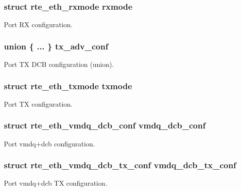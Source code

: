 \subsubsection[{rxmode}]{\setlength{\rightskip}{0pt plus 5cm}struct {\bf rte\+\_\+eth\+\_\+rxmode} rxmode}\label{structrte__eth__conf_a346eef99c24f617b74c440c1aa565d01}
Port R\+X configuration. \hypertarget{structrte__eth__conf_a55469f11d3c2e6c76488152651bcf464}{}
\subsubsection[{tx\+\_\+adv\+\_\+conf}]{\setlength{\rightskip}{0pt plus 5cm}union \{ ... \}   tx\+\_\+adv\+\_\+conf}\label{structrte__eth__conf_a55469f11d3c2e6c76488152651bcf464}
Port T\+X D\+C\+B configuration (union). \hypertarget{structrte__eth__conf_a1c33c9d2e5cdb14b62ed386bf3159e07}{}
\subsubsection[{txmode}]{\setlength{\rightskip}{0pt plus 5cm}struct {\bf rte\+\_\+eth\+\_\+txmode} txmode}\label{structrte__eth__conf_a1c33c9d2e5cdb14b62ed386bf3159e07}
Port T\+X configuration. \hypertarget{structrte__eth__conf_a3955257d0cf03d4f49c64e674f132359}{}
\subsubsection[{vmdq\+\_\+dcb\+\_\+conf}]{\setlength{\rightskip}{0pt plus 5cm}struct {\bf rte\+\_\+eth\+\_\+vmdq\+\_\+dcb\+\_\+conf} vmdq\+\_\+dcb\+\_\+conf}\label{structrte__eth__conf_a3955257d0cf03d4f49c64e674f132359}
Port vmdq+dcb configuration. \hypertarget{structrte__eth__conf_ab8442ca78157e2e4ab788ee7066c4022}{}
\subsubsection[{vmdq\+\_\+dcb\+\_\+tx\+\_\+conf}]{\setlength{\rightskip}{0pt plus 5cm}struct rte\+\_\+eth\+\_\+vmdq\+\_\+dcb\+\_\+tx\+\_\+conf vmdq\+\_\+dcb\+\_\+tx\+\_\+conf}\label{structrte__eth__conf_ab8442ca78157e2e4ab788ee7066c4022}
Port vmdq+dcb T\+X configuration. \hypertarget{structrte__eth__conf_a17845d02c4ddfdc09982bd899b6df06e}{}
